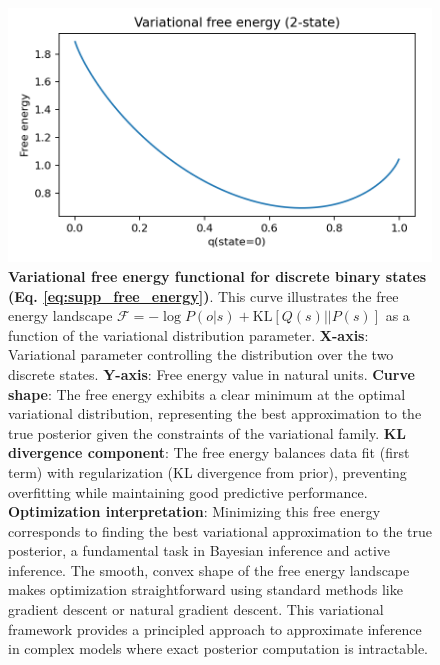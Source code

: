 \documentclass[
  10pt,
]{article}
\begin{document}
\begin{figure}
\centering
\includegraphics{../output/figures/free_energy_curve.png}
\caption{\textbf{Variational free energy functional for discrete binary
states (Eq. \ref{eq:supp_free_energy})}. This curve illustrates the free
energy landscape \(\mathcal{F} = -\log P(o|s) + \text{KL}[Q(s)||P(s)]\)
as a function of the variational distribution parameter.
\textbf{X-axis}: Variational parameter controlling the distribution over
the two discrete states. \textbf{Y-axis}: Free energy value in natural
units. \textbf{Curve shape}: The free energy exhibits a clear minimum at
the optimal variational distribution, representing the best
approximation to the true posterior given the constraints of the
variational family. \textbf{KL divergence component}: The free energy
balances data fit (first term) with regularization (KL divergence from
prior), preventing overfitting while maintaining good predictive
performance. \textbf{Optimization interpretation}: Minimizing this free
energy corresponds to finding the best variational approximation to the
true posterior, a fundamental task in Bayesian inference and active
inference. The smooth, convex shape of the free energy landscape makes
optimization straightforward using standard methods like gradient
descent or natural gradient descent. This variational framework provides
a principled approach to approximate inference in complex models where
exact posterior computation is intractable.}
\end{figure}
\end{document}
